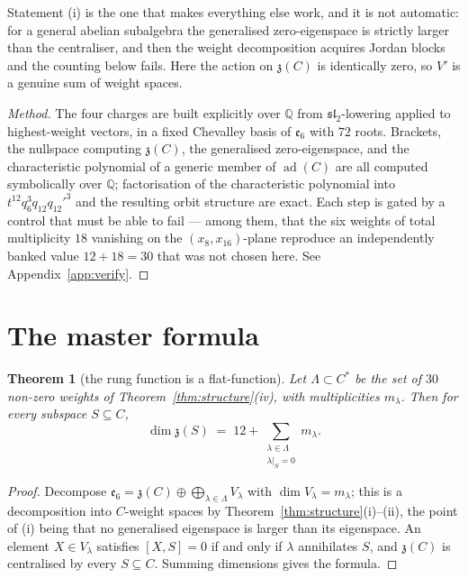 \documentclass[11pt,a4paper]{article}
\newtheorem{theorem}{Theorem}[section]
\theoremstyle{definition}
\theoremstyle{remark}
\newcommand{\esix}{\mathfrak{e}_6}
\newcommand{\slt}{\mathfrak{sl}_2}
\newcommand{\z}{\mathfrak{z}}
\newcommand{\Q}{\mathbb{Q}}
\newcommand{\ad}{\operatorname{ad}}
\begin{document}
Statement (i) is the one that makes everything else work, and it is not automatic: for a general
abelian subalgebra the generalised zero-eigenspace is strictly larger than the centraliser, and
then the weight decomposition acquires Jordan blocks and the counting below fails. Here the
action on $\z(C)$ is identically zero, so $V'$ is a genuine sum of weight spaces.

\begin{proof}[Method]
The four charges are built explicitly over $\Q$ from $\slt$-lowering applied to highest-weight
vectors, in a fixed Chevalley basis of $\esix$ with $72$ roots. Brackets, the nullspace computing
$\z(C)$, the generalised zero-eigenspace, and the characteristic polynomial of a generic member
of $\ad(C)$ are all computed symbolically over $\Q$; factorisation of the characteristic
polynomial into $t^{12}q_6^3q_{12}q_{12}'^3$ and the resulting orbit structure are exact. Each
step is gated by a control that must be able to fail --- among them, that the six weights of
total multiplicity $18$ vanishing on the $(x_8,x_{16})$-plane reproduce an independently banked
value $12+18=30$ that was not chosen here. See Appendix~\ref{app:verify}.
\end{proof}

\section{The master formula}\label{sec:master}

\begin{theorem}[the rung function is a flat-function]\label{thm:master}
Let $\Lambda\subset C^*$ be the set of $30$ non-zero weights of Theorem~\ref{thm:structure}(iv),
with multiplicities $m_\lambda$. Then for every subspace $S\subseteq C$,
\[
   \dim\z(S)\;=\;12+\sum_{\substack{\lambda\in\Lambda\\ \lambda|_S=0}} m_\lambda .
\]
\end{theorem}

\begin{proof}
Decompose $\esix=\z(C)\oplus\bigoplus_{\lambda\in\Lambda}V_\lambda$ with $\dim
V_\lambda=m_\lambda$; this is a decomposition into $C$-weight spaces by
Theorem~\ref{thm:structure}(i)--(ii), the point of (i) being that no generalised eigenspace is
larger than its eigenspace. An element $X\in V_\lambda$ satisfies $[X,S]=0$ if and only if
$\lambda$ annihilates $S$, and $\z(C)$ is centralised by every $S\subseteq C$. Summing
dimensions gives the formula.
\end{proof}
\end{document}
